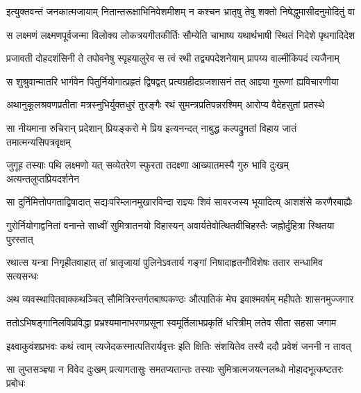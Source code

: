 \fourlineindentedshloka
{इत्युक्तवन्तं जनकात्मजायाम्}
{नितान्तरूक्षाभिनिवेशमीशम्}
{न कश्चन भ्रातृषु तेषु शक्तो}
{निषेद्धुमासीदनुमोदितुं वा} %

\fourlineindentedshloka
{स लक्ष्मणं लक्ष्मणपूर्वजन्मा}
{विलोक्य लोकत्रयगीतकीर्तिः}
{सौम्येति चाभाष्य यथार्थभाषी}
{स्थितं निदेशे पृथगादिदेश} %

\fourlineindentedshloka
{प्रजावती दोहदशंसिनी ते}
{तपोवनेषु स्पृहयालुरेव}
{स त्वं रथी तद्व्यपदेशनेयाम्}
{प्रापय्य वाल्मीकिपदं त्यजैनाम्} %

\fourlineindentedshloka
{स शुश्रुवान्मातरि भार्गवेन}
{पितुर्नियोगात्प्रहृतं द्विषद्वत्}
{प्रत्यग्रहीदग्रजशासनं तत्}
{आज्ञ्या गुरूणां ह्यविचारणीया} %

\fourlineindentedshloka
{अथानुकूलश्रवणप्रतीता}
{मत्रस्नुभिर्युक्तधुरं तुरङ्गैः}
{रथं सुमन्त्रप्रतिपन्नरश्मिम्}
{आरोप्य वैदेहसुतां प्रतस्थे} %

\fourlineindentedshloka
{सा नीयमाना रुचिरान् प्रदेशान्}
{प्रियङ्करो मे प्रिय इत्यनन्दत्}
{नाबुद्ध कल्पद्रुमतां विहाय}
{जातं तमात्मन्यसिपत्रवृक्षम्} %

\fourlineindentedshloka
{जुगूह तस्याः पथि लक्ष्मणो यत्}
{सव्येतरेण स्फुरता तदक्ष्णा}
{आख्यातमस्यै गुरु भावि दुःखम्}
{अत्यन्तलुप्तप्रियदर्शनेन} %

\fourlineindentedshloka
{सा दुर्निमित्तोपगताद्विषादात्}
{सद्यःपरिम्लानमुखारविन्दा}
{राज्ञ्यः शिवं सावरजस्य भूयादित्य्}
{आशशंसे करणैरबाह्यैः} %

\fourlineindentedshloka
{गुरोर्नियोगाद्वनितां वनान्ते}
{साध्वीं सुमित्रातनयो विहास्यन्}
{अवार्यतेवोत्थितवीचिहस्तैः}
{जह्नोर्दुहित्रा स्थितया पुरस्तात्} %

\fourlineindentedshloka
{रथात्स यन्त्रा निगृहीतवाहात्}
{तां भ्रातृजायां पुलिनेऽवतार्य}
{गङ्गां निषादाहृतनौविशेषः}
{ततार सन्धामिव सत्यसन्धः} %

\fourlineindentedshloka
{अथ व्यवस्थापितवाक्कथञ्चित्}
{सौमित्रिरन्तर्गतबाष्पकण्ठः}
{औत्पातिकं मेघ इवाश्मवर्षम्}
{महीपतेः शासनमुज्जगार} %

\fourlineindentedshloka
{ततोऽभिषङ्गानिलविप्रविद्धा}
{प्रभ्रश्यमानाभरणप्रसूना}
{स्वमूर्तिलाभप्रकृतिं धरित्रीम्}
{लतेव सीता सहसा जगाम} %

\fourlineindentedshloka
{इक्ष्वाकुवंशप्रभवः कथं त्वाम्}
{त्यजेदकस्मात्पतिरार्यवृत्तः}
{इति क्षितिः संशयितेव तस्यै}
{ददौ प्रवेशं जननी न तावत्} %

\fourlineindentedshloka
{सा लुप्तसञ्ज्ञ्या न विवेद दुःखम्}
{प्रत्यागतासुः समतप्यतान्तः}
{तस्याः सुमित्रात्मजयत्नलब्धो}
{मोहादभूत्कष्टतरः प्रबोधः} %

